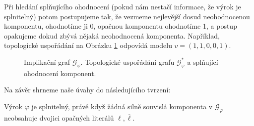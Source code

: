 Při hledání splňujícího ohodnocení (pokud nám nestačí informace, že výrok je splnitelný) potom postupujeme tak, že vezmeme nejlevější dosud neohodnocenou komponentu, ohodnotíme ji 0, opačnou komponentu ohodnotíme 1, a postup opakujeme dokud zbývá nějaká neohodnocená komponenta. Například, topologické uspořádání na Obrázku \ref{figure:implication-graph-topological-order} odpovídá modelu $v=(1,1,0,0,1)$.

\begin{figure} 
    \small   
    \centering
        \caption{Implikační graf $\mathcal G_\varphi$. Topologické uspořádání grafu $\mathcal G_\varphi^\ast$ a splňující ohodnocení komponent.}\label{figure:implication-graph-topological-order}
\end{figure}

Na závěr shrneme naše úvahy do následujícího tvrzení:

\begin{proposition}\label{proposition:2-sat-algorithm}
    Výrok $\varphi$ je splnitelný, právě když žádná silně souvislá komponenta v $\mathcal G_\varphi$ neobsahuje dvojici opačných literálů $\ell,\overline{\ell}$.
\end{proposition}

